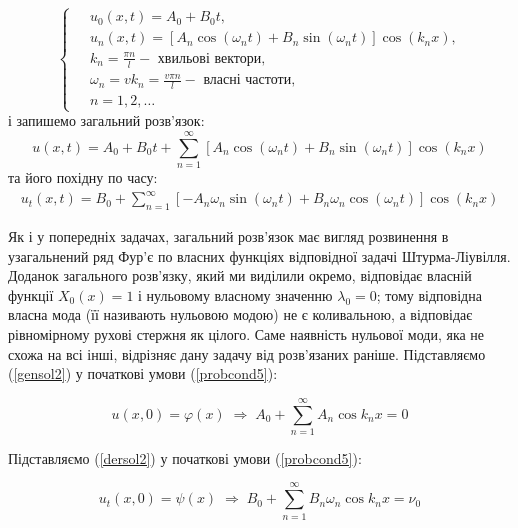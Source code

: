 \begin{equation}
    \left\{ \begin{aligned} \label{fullsol2}
        \;&u_0(x,t) = A_0 + B_0 t, \\
        &u_n(x,t) = \left[A_n\cos(\omega_n t) + B_n\sin(\omega_n t)\right] \cos(k_n x), \\
        &k_n = \frac{\pi n}{l} - \text{ хвильові вектори}, \\
        &\omega_n = vk_n = \frac{v \pi n}{l} - \text{ власні частоти}, \\
        &n = 1, 2,\ldots
    \end{aligned}\right.
\end{equation}
і запишемо загальний розв'язок:
\begin{equation} \label{gensol2}
    u(x,t) = A_0 + B_0 t + \sum^{\infty}_{n=1} \left[A_n\cos(\omega_n t) + B_n\sin(\omega_n t)\right] \cos(k_n x)
\end{equation}
та його похідну по часу:
\begin{equation} \label{dersol2}
    \begin{aligned}
        u_t(x,t) = B_0 + \sum^{\infty}_{n=1}\left[-A_n\omega_n\sin(\omega_n t) + B_n\omega_n\cos(\omega_n t)\right] \cos(k_n x)  
    \end{aligned}
\end{equation}

Як і у попередніх задачах, загальний розв'язок має вигляд  розвинення в узагальнений ряд Фур'є по власних функціях відповідної задачі Штурма-Ліувілля. Доданок загального розв'язку, який ми виділили окремо, відповідає власній функції $X_0(x)=1$ і нульовому власному значенню $\lambda_0=0$; тому відповідна власна мода (її називають нульовою модою) не є коливальною, а відповідає рівномірному рухові стержня як цілого. Саме наявність нульової моди, яка не схожа на всі інші, відрізняє дану задачу від розв'язаних раніше.
 Підставляємо (\ref{gensol2}) у початкові умови (\ref{probcond5}):

\begin{equation} \label{sol-init-pos}
    u(x,0) = \varphi(x) \;\Rightarrow\; A_0 + \sum^{\infty}_{n=1} A_n\cos k_nx = 0
\end{equation}


Підставляємо (\ref{dersol2}) у початкові умови (\ref{probcond5}):

\begin{equation} \label{sol-init-pos}
    u_t(x,0) = \psi(x) \;\Rightarrow\; B_0 + \sum^{\infty}_{n=1} B_n \omega_n \cos k_nx = \nu_0     
\end{equation}

